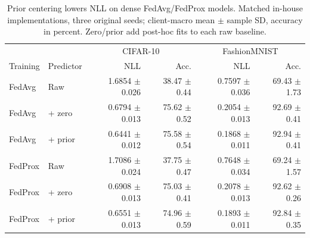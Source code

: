 \begin{table}[!tbp]
\centering
\small
\setlength{\tabcolsep}{0.6pt}
\caption{Prior centering lowers NLL on dense FedAvg/FedProx models. Matched in-house implementations, three original seeds; client-macro mean $\pm$ sample SD, accuracy in percent. Zero/prior add post-hoc fits to each raw baseline.}
\label{tab:dense_baselines}
\begin{tabular}{llrrrr}
\toprule
& & \multicolumn{2}{c}{CIFAR-10} & \multicolumn{2}{c}{FashionMNIST} \\
Training & Predictor & NLL & Acc. & NLL & Acc. \\
\midrule
FedAvg & Raw & 1.6854 $\pm$ 0.026 & 38.47 $\pm$ 0.44 & 0.7597 $\pm$ 0.036 & 69.43 $\pm$ 1.73 \\
FedAvg & + zero & 0.6794 $\pm$ 0.013 & 75.62 $\pm$ 0.52 & 0.2054 $\pm$ 0.013 & 92.69 $\pm$ 0.41 \\
FedAvg & + prior & 0.6441 $\pm$ 0.012 & 75.58 $\pm$ 0.54 & 0.1868 $\pm$ 0.011 & 92.94 $\pm$ 0.41 \\
FedProx & Raw & 1.7086 $\pm$ 0.024 & 37.75 $\pm$ 0.47 & 0.7648 $\pm$ 0.034 & 69.24 $\pm$ 1.57 \\
FedProx & + zero & 0.6908 $\pm$ 0.013 & 75.03 $\pm$ 0.41 & 0.2078 $\pm$ 0.013 & 92.62 $\pm$ 0.26 \\
FedProx & + prior & 0.6551 $\pm$ 0.013 & 74.96 $\pm$ 0.59 & 0.1893 $\pm$ 0.011 & 92.84 $\pm$ 0.35 \\
\bottomrule
\end{tabular}
\end{table}
